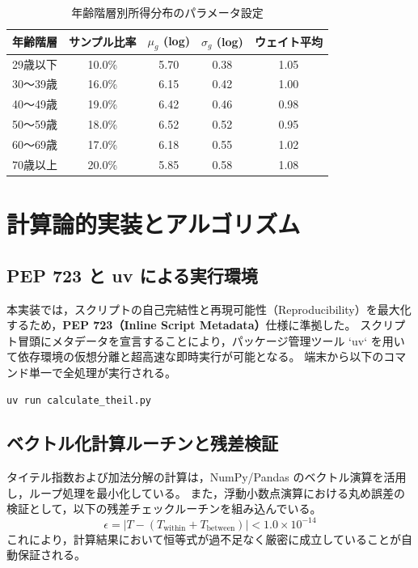 \documentclass[paper=a4,fontsize=10.5pt,line_length=42zw]{jlreq}
\begin{document}
\begin{table}[htbp]
\centering
\caption{年齢階層別所得分布のパラメータ設定}
\label{tab:distribution_params}
\small
\begin{tabular}{lcccc}
\toprule
年齢階層 & サンプル比率 & $\mu_g$ (log) & $\sigma_g$ (log) & ウェイト平均 \\
\midrule
29歳以下 & 10.0\% & 5.70 & 0.38 & 1.05 \\
30〜39歳 & 16.0\% & 6.15 & 0.42 & 1.00 \\
40〜49歳 & 19.0\% & 6.42 & 0.46 & 0.98 \\
50〜59歳 & 18.0\% & 6.52 & 0.52 & 0.95 \\
60〜69歳 & 17.0\% & 6.18 & 0.55 & 1.02 \\
70歳以上 & 20.0\% & 5.85 & 0.58 & 1.08 \\
\bottomrule
\end{tabular}
\end{table}

\section{計算論的実装とアルゴリズム}

\subsection{PEP 723 と uv による実行環境}
本実装では，スクリプトの自己完結性と再現可能性（Reproducibility）を最大化するため，\textbf{PEP 723（Inline Script Metadata）}仕様に準拠した。
スクリプト冒頭にメタデータを宣言することにより，パッケージ管理ツール `uv` を用いて依存環境の仮想分離と超高速な即時実行が可能となる。
端末から以下のコマンド単一で全処理が実行される。
\begin{verbatim}
uv run calculate_theil.py
\end{verbatim}

\subsection{ベクトル化計算ルーチンと残差検証}
タイテル指数および加法分解の計算は，NumPy/Pandas のベクトル演算を活用し，ループ処理を最小化している。
また，浮動小数点演算における丸め誤差の検証として，以下の残差チェックルーチンを組み込んでいる。
\begin{equation}
    \epsilon = |T - (T_{\text{within}} + T_{\text{between}})| < 1.0 \times 10^{-14}
\end{equation}
これにより，計算結果において恒等式が過不足なく厳密に成立していることが自動保証される。
\end{document}
